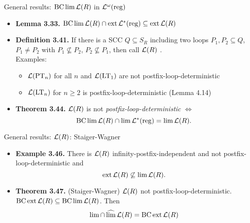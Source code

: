 \documentclass[
	handout,
	notheorems,noamsthm]{beamer}
\begin{document}
\begin{frame}[<+->]{General results: $\operatorname{BC} \lim \mathcal{L}(R)$ in $\mathcal{L}^\omega(\textup{\textrm{reg}})$}
\begin{itemize}
\item \textbf{Lemma 3.33.} $\operatorname{BC} \lim \mathcal{L}(R) \cap \operatorname{ext} \mathcal{L}^*(\textup{\textrm{reg}}) \subseteq \operatorname{ext} \mathcal{L}(R)$
\item \textbf{Definition 3.41.} If there is a SCC $Q \subseteq S_R$ including two loops $P_1,P_2 \subseteq Q$, $P_1 \neq P_2$ with $P_1 \not\subseteq P_2$, $P_2 \not\subseteq P_1$, then call $\mathcal{L}(R)$ . \\
Examples:
\begin{itemize}
\item $\mathcal{L}(\textup{\textrm{PT}}_n)$ for all $n$ and $\mathcal{L}(\textup{\textrm{LT}}_1)$ are not postfix-loop-deterministic
\item $\mathcal{L}(\textup{\textrm{LT}}_n)$ for $n \ge 2$ is postfix-loop-deterministic (Lemma 4.14)
\end{itemize}
\item \textbf{Theorem 3.44.} $\mathcal{L}(R)$ is not \emph{postfix-loop-deterministic} $\Leftrightarrow$
\[ \operatorname{BC} \lim \mathcal{L}(R) \cap \lim \mathcal{L}^*(\textup{\textrm{reg}}) = \lim \mathcal{L}(R) . \]
\end{itemize}
\end{frame}

\begin{frame}[<+->]{General results: $\mathcal{L}(R)$: Staiger-Wagner}
\begin{itemize}
\item \textbf{Example 3.46.} There is $\mathcal{L}(R)$ infinity-postfix-independent and not postfix-loop-deterministic and
\[ \operatorname{ext} \mathcal{L}(R) \not\subseteq \lim \mathcal{L}(R) . \]
\item \textbf{Theorem 3.47.} (Staiger-Wagner) $\mathcal{L}(R)$ not postfix-loop-deterministic. $\operatorname{BC} \operatorname{ext} \mathcal{L}(R) \subseteq \operatorname{BC} \lim \mathcal{L}(R)$. Then
\[ \lim \cap \operatorname{\widehat{lim}} \mathcal{L}(R) = \operatorname{BC} \operatorname{ext} \mathcal{L}(R) \]
\end{itemize}
\end{frame}
\end{document}
